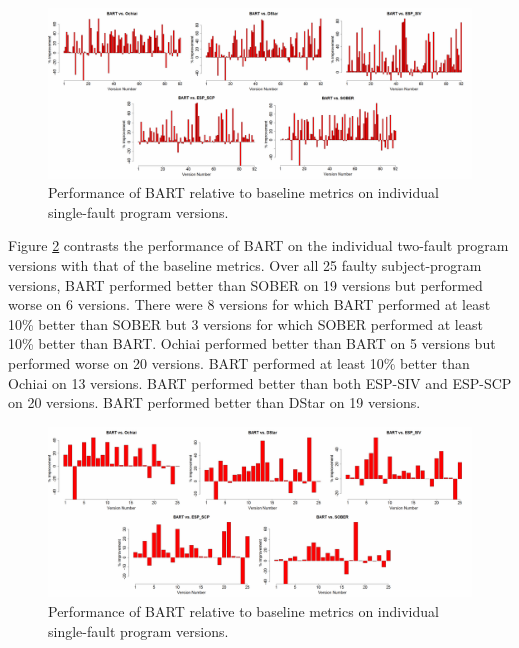 \begin{figure}
\centering
\includegraphics[width=\textwidth]{chapter4_BART_VS_Base.pdf}
\caption{Performance of BART relative to baseline metrics on individual single-fault program versions.}
\label{BART_VS_Base}
\end{figure}

Figure \ref{BART_VS_Base_M} contrasts the performance of BART on the individual two-fault program versions with that of the baseline metrics.  Over all 25 faulty subject-program versions, BART performed better than SOBER on 19 versions but performed worse on 6 versions.  There were 8 versions for which BART performed at least 10\% better than SOBER but 3 versions for which SOBER performed at least 10\% better than BART.  Ochiai performed better than BART on 5 versions but performed worse on 20 versions. BART performed at least 10\% better than Ochiai on 13 versions. BART performed better than both ESP-SIV and ESP-SCP on 20 versions.   BART performed better than DStar on 19 versions.

\begin{figure}
\centering
\includegraphics[width=\textwidth]{chapter4_BARTvsBase_M.pdf}
\caption{Performance of BART relative to baseline metrics on individual single-fault program versions.}
\label{BART_VS_Base_M}
\end{figure}


